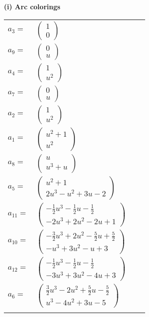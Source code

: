 \documentclass[1p]{elsarticle_modified}
\theoremstyle{definition}
\begin{document}
\flushleft \textbf{(i) Arc colorings}\\
\begin{tabular}{m{7pt} m{180pt} m{7pt} m{180pt} }
\flushright $a_{3}=$&$\begin{pmatrix}1\\0\end{pmatrix}$ \\
\flushright $a_{9}=$&$\begin{pmatrix}0\\u\end{pmatrix}$ \\
\flushright $a_{4}=$&$\begin{pmatrix}1\\u^2\end{pmatrix}$ \\
\flushright $a_{7}=$&$\begin{pmatrix}0\\u\end{pmatrix}$ \\
\flushright $a_{2}=$&$\begin{pmatrix}1\\u^2\end{pmatrix}$ \\
\flushright $a_{1}=$&$\begin{pmatrix}u^2+1\\u^2\end{pmatrix}$ \\
\flushright $a_{8}=$&$\begin{pmatrix}u\\u^3+u\end{pmatrix}$ \\
\flushright $a_{5}=$&$\begin{pmatrix}u^2+1\\2 u^3- u^2+3 u-2\end{pmatrix}$ \\
\flushright $a_{11}=$&$\begin{pmatrix}-\frac{1}{2} u^3-\frac{1}{2} u-\frac{1}{2}\\-2 u^3+2 u^2-2 u+1\end{pmatrix}$ \\
\flushright $a_{10}=$&$\begin{pmatrix}-\frac{3}{2} u^3+2 u^2-\frac{5}{2} u+\frac{5}{2}\\- u^3+3 u^2- u+3\end{pmatrix}$ \\
\flushright $a_{12}=$&$\begin{pmatrix}-\frac{1}{2} u^3-\frac{1}{2} u-\frac{1}{2}\\-3 u^3+3 u^2-4 u+3\end{pmatrix}$ \\
\flushright $a_{6}=$&$\begin{pmatrix}\frac{3}{2} u^3-2 u^2+\frac{5}{2} u-\frac{5}{2}\\u^3-4 u^2+3 u-5\end{pmatrix}$\\&\end{tabular}
\end{document}
